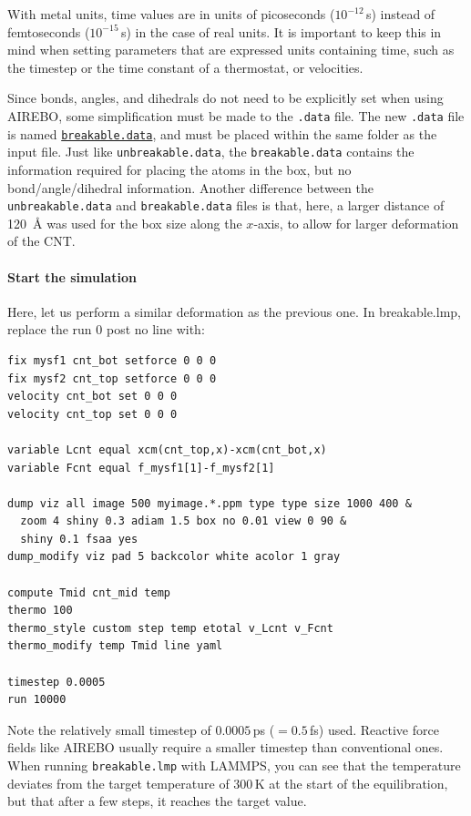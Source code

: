 \documentclass[9pt,tutorial]{livecoms}
\newcommand{\lmpcmd}[1]{\hspace{0pt}\colorbox{listing}{\textcolor{command}{\small{#1}}}\hspace{0pt}} %
\newcommand{\lmpcmdnote}[1]{\hspace{0pt}\colorbox{note_listing}{\textcolor{command}{\small{#1}}}\hspace{0pt}} %
\newcommand{\flecmd}[1]{\textcolor{command}{\texttt{#1}}} %
\newcommand{\dwlcmd}[1]{\textcolor{download}{\texttt{#1}}} %
\newcommand{\filepath}{https://raw.githubusercontent.com/lammpstutorials/lammpstutorials-article/main/files/}
\begin{document}
\begin{note}
  With \lmpcmdnote{metal} units, time values are in units of picoseconds
  ($10^{-12}$\,s) instead of femtoseconds ($10^{-15}$\,s) in the case of
  \lmpcmdnote{real} units.  It is important to keep this in mind when
  setting parameters that are expressed units containing time, such as
  the timestep or the time constant of a thermostat, or velocities.
\end{note}

Since bonds, angles, and dihedrals do not need to be explicitly set when
using AIREBO, some simplification must be made to the \flecmd{.data}
file.  The new \flecmd{.data} file is named
%
\href{\filepath tutorial2/breakable.data}{\dwlcmd{breakable.data}},
%
and must be placed within the same folder as the input file.  Just like
\flecmd{unbreakable.data}, the \flecmd{breakable.data} contains the
information required for placing the atoms in the box, but no
bond/angle/dihedral information.  Another difference between the
\flecmd{unbreakable.data} and \flecmd{breakable.data} files is that,
here, a larger distance of 120~Å was used for the box size along
the $x$-axis, to allow for larger deformation of the CNT.

\paragraph{Start the simulation}

Here, let us perform a similar deformation as the previous one.
In \lmpcmd{breakable.lmp}, replace the \lmpcmd{run 0 post no} line with:
\begin{lstlisting}
fix mysf1 cnt_bot setforce 0 0 0
fix mysf2 cnt_top setforce 0 0 0
velocity cnt_bot set 0 0 0
velocity cnt_top set 0 0 0

variable Lcnt equal xcm(cnt_top,x)-xcm(cnt_bot,x)
variable Fcnt equal f_mysf1[1]-f_mysf2[1]

dump viz all image 500 myimage.*.ppm type type size 1000 400 &
  zoom 4 shiny 0.3 adiam 1.5 box no 0.01 view 0 90 &
  shiny 0.1 fsaa yes
dump_modify viz pad 5 backcolor white acolor 1 gray

compute Tmid cnt_mid temp
thermo 100
thermo_style custom step temp etotal v_Lcnt v_Fcnt
thermo_modify temp Tmid line yaml

timestep 0.0005
run 10000
\end{lstlisting}
Note the relatively small timestep of $0.0005$\,ps ($= 0.5$\,fs) used.  Reactive force
fields like AIREBO usually require a smaller timestep than conventional ones.  When running
\flecmd{breakable.lmp} with LAMMPS, you can see that the temperature deviates
from the target temperature of $300\,\text{K}$ at the start of the equilibration,
but that after a few steps, it reaches the target value.
\end{document}
